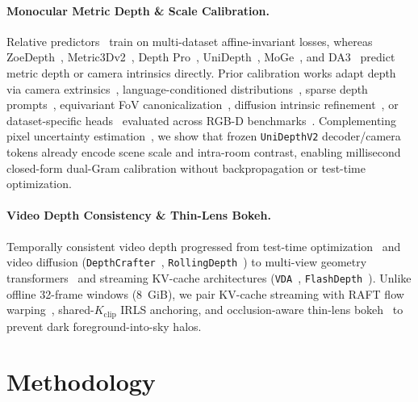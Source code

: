 \documentclass[10pt,twocolumn,letterpaper]{article}
\begin{document}
\vspace{-0.2em}
\paragraph{Monocular Metric Depth \& Scale Calibration.}
Relative predictors~\cite{ranftl2020midas,ranftl2021dpt,yang2024depthanything,yang2024dav2} train on multi-dataset affine-invariant losses, whereas ZoeDepth~\cite{bhat2023zoedepth}, Metric3Dv2~\cite{yin2024metric3dv2}, Depth Pro~\cite{bochkovskii2025depthpro}, UniDepth~\cite{piccinelli2024unidepth,piccinelli2025unidepthv2}, MoGe~\cite{wang2025moge,wang2025moge2}, and DA3~\cite{lin2025da3} predict metric depth or camera intrinsics directly. Prior calibration works adapt depth via camera extrinsics~\cite{zhu2020scalenet}, language-conditioned distributions~\cite{zeng2024rsa}, sparse depth prompts~\cite{lin2025promptda,wang2025priorda}, equivariant FoV canonicalization~\cite{guo2025dac}, diffusion intrinsic refinement~\cite{deng2025dmcalib}, or dataset-specific heads~\cite{zhu2024scaledepth} evaluated across RGB-D benchmarks~\cite{sturm2012tum,silberman2012nyu}. Complementing pixel uncertainty estimation~\cite{ilg2018uncertainty}, we show that frozen \texttt{UniDepthV2} decoder/camera tokens already encode scene scale and intra-room contrast, enabling millisecond closed-form dual-Gram calibration without backpropagation or test-time optimization.

\vspace{-0.2em}
\paragraph{Video Depth Consistency \& Thin-Lens Bokeh.}
Temporally consistent video depth progressed from test-time optimization~\cite{wang2023nvds} and video diffusion (\texttt{DepthCrafter}~\cite{hu2025depthcrafter}, \texttt{RollingDepth}~\cite{ke2025rollingdepth}) to multi-view geometry transformers~\cite{wang2025vggt} and streaming KV-cache architectures (\texttt{VDA}~\cite{chen2025vda}, \texttt{FlashDepth}~\cite{chou2025flashdepth}). Unlike offline 32-frame windows ($8$~GiB), we pair KV-cache streaming with RAFT flow warping~\cite{teed2020raft}, shared-$K_{\mathrm{clip}}$ IRLS anchoring, and occlusion-aware thin-lens bokeh~\cite{peng2022bokehme,sheng2024drbokeh} to prevent dark foreground-into-sky halos.

\section{Methodology}
\end{document}
